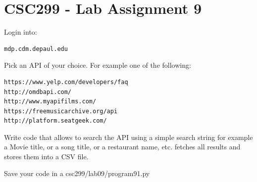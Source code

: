 \documentclass[12pt]{article}
\begin{document}
\section{CSC299 - Lab Assignment 9}

\noindent Login into:
\begin{verbatim}
mdp.cdm.depaul.edu
\end{verbatim}

Pick an API of your choice. For example one of the following:

\begin{verbatim}
https://www.yelp.com/developers/faq
http://omdbapi.com/
http://www.myapifilms.com/
https://freemusicarchive.org/api
http://platform.seatgeek.com/
\end{verbatim}

Write code that allows to search the API using a simple search string for example a Movie title, or a song title, or a restaurant name, etc. fetches all results and stores them into a CSV file.

Save your code in a csc299/lab09/program91.py
\end{document}

